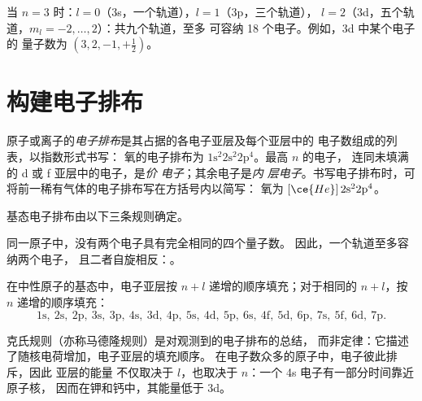 \begin{example}[第三电子层]\label{ex:b1:quantum-numbers:third}
当 $n = 3$ 时：$l = 0$（3s，一个轨道），$l = 1$（3p，三个轨道），
$l = 2$（3d，五个轨道，$m_l = -2, \dots, 2$）：共九个轨道，至多
可容纳 18 个电子。例如，3d 中某个电子的
量子数为 $(3, 2, -1, +\tfrac12)$。
\end{example}

\section{构建电子排布}

\begin{definition}[电子排布]\label{def:b1:quantum-numbers:configuration}
原子或离子的\emph{电子排布}是其占据的各电子亚层及每个亚层中的
电子数组成的列表，以指数形式书写：
氧的电子排布为 $1\text{s}^2 2\text{s}^2
2\text{p}^4$。最高 $n$ 的电子，
连同未填满的 d 或 f 亚层中的电子，是\emph{价
电子}；其余电子是\emph{内
层电子}。书写电子排布时，可
将前一稀有气体的电子排布写在方括号内以简写：
氧为 $[\ce{He}]\,2\text{s}^2 2\text{p}^4$。
\end{definition}

基态电子排布由以下三条规则确定。

\begin{proposition}[泡利不相容原理]\label{prop:b1:quantum-numbers:pauli}
同一原子中，没有两个电子具有完全相同的四个量子数。
因此，一个轨道至多容纳两个电子，
且二者自旋相反：。
\end{proposition}
\admitted

\begin{proposition}[克氏规则]\label{prop:b1:quantum-numbers:klechkowski}
在中性原子的基态中，电子亚层按
$n + l$ 递增的顺序填充；对于相同的 $n + l$，按
$n$ 递增的顺序填充：
\[
  1\text{s},\ 2\text{s},\ 2\text{p},\ 3\text{s},\ 3\text{p},\ 4\text{s},\
  3\text{d},\ 4\text{p},\ 5\text{s},\ 4\text{d},\ 5\text{p},\ 6\text{s},\
  4\text{f},\ 5\text{d},\ 6\text{p},\ 7\text{s},\ 5\text{f},\ 6\text{d},\
  7\text{p}.
\]
\end{proposition}
\admitted

\begin{remark}[经验规则]\label{rem:b1:quantum-numbers:klech-empirical}
克氏规则（亦称马德隆规则）是对观测到的电子排布的总结，
而非定律：它描述了随核电荷增加，电子亚层的填充顺序。
在电子数众多的原子中，电子彼此排斥，因此
亚层的能量
不仅取决于 $l$，也取决于 $n$：一个 4s 电子有一部分时间靠近原子核，
因而在钾和钙中，其能量低于 3d。
\end{remark}

